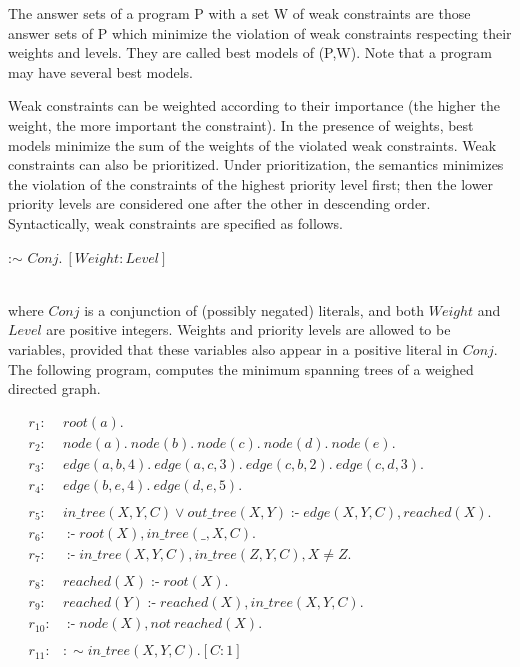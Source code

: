 \documentclass[a4paper, titlepage]{article}
\DeclareMathOperator{\leftimpl}{:-}
\begin{document}
The answer sets of a program P with a set W of weak 
constraints are those answer sets of P which minimize the 
violation of weak constraints respecting their weights and 
levels. They are called best models of (P,W). Note that a 
program may have several best models.


Weak constraints can be weighted according to their 
importance (the higher the weight, the more important the 
constraint). In the presence of weights, best models 
minimize the sum of the weights of the violated weak 
constraints. Weak constraints can also be prioritized. 
Under prioritization, the semantics minimizes the violation 
of the constraints of the highest priority level first; 
then the lower priority levels are considered one after the 
other in descending order. Syntactically, weak constraints 
are specified as follows. \\ \centerline{:$\sim$ $\mathit{Conj}. \  
[\mathit{Weight}\colon\mathit{Level}]$} \\ where $\mathit{Conj}$ 
is a conjunction of (possibly negated) literals, and both 
$\mathit{Weight}$ and $\mathit{Level}$ are positive 
integers. Weights and priority levels are allowed to be 
variables, provided that these variables also appear in a 
positive literal in $\mathit{Conj}$.
The following program, computes the minimum spanning trees 
of a weighed directed graph.
\begin{exmp}
\begin{align*}
r_1\colon& \mathit{root}(a). \\
r_2\colon& \mathit{node}(a). \ \mathit{node}(b). \ 
\mathit{node}(c). \ \mathit{node}(d). \ \mathit{node}(e). \ \\
r_3\colon& \mathit{edge}(a,b,4). \ \mathit{edge}(a,c,3). \ 
\mathit{edge}(c,b,2). \ \mathit{edge}(c,d,3). \ \\
r_4\colon& \mathit{edge}(b,e,4). \ \mathit{edge}(d,e,5). \ \\
\\
r_5 \colon & \mathit{in\_tree}(X,Y,C) \vee 
\mathit{out\_tree}(X,Y) \leftimpl \mathit{edge}(X,Y,C), 
\mathit{reached}(X). \\
r_6\colon& \leftimpl \mathit{root}(X), \mathit{in\_tree}
(\_,X,C).\\
r_7\colon& \leftimpl \mathit{in\_tree}(X,Y,C), 
\mathit{in\_tree}(Z,Y,C), X \neq Z. \\
\\
r_{8}\colon& \mathit{reached}(X) \leftimpl \mathit{root}
(X). \\
r_{9}\colon& \mathit{reached}(Y) \leftimpl 
\mathit{reached}(X), \mathit{in\_tree}(X,Y,C). \\
r_{10}\colon& \leftimpl \mathit{node}(X), \mathit{not} \ 
\mathit{reached}(X). \\
\\
r_{11}\colon&\mathit{ : \sim in\_tree}(X,Y,C). [C:1]
\end{align*}
\end{exmp}
\end{document}
